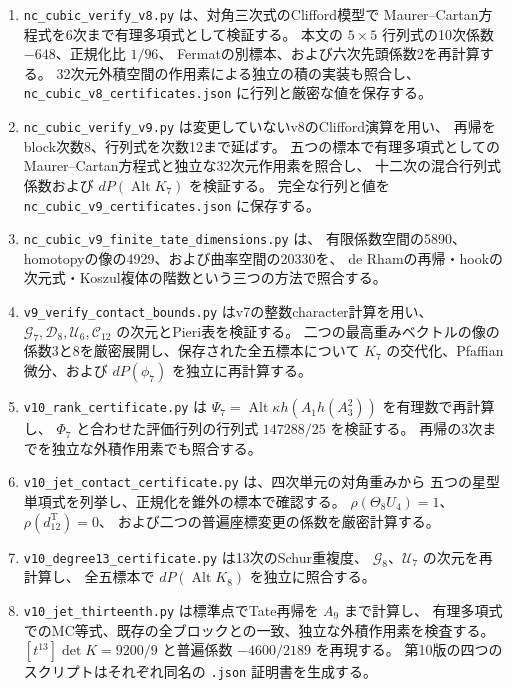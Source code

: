 \documentclass[a4paper,11pt]{ltjsarticle}
\theoremstyle{definition}
\begin{document}
\begin{enumerate}
 characterに適合する候補を選び、Reynolds投影によるJacobian像の階数2、
 Hessian候補を加えた階数3、および非所属を示す一つの単項式の係数を検証する。
 このコードは実際の境界の10次係数を決定するものではない。
 \item \texttt{nc\_cubic\_verify\_v8.py} は、対角三次式のClifford模型で
 Maurer--Cartan方程式を6次まで有理多項式として検証する。
 本文の $5\times5$ 行列式の10次係数 $-648$、正規化比 $1/96$、
 Fermatの別標本、および六次先頭係数2を再計算する。
 32次元外積空間の作用素による独立の積の実装も照合し、
 \texttt{nc\_cubic\_v8\_certificates.json} に行列と厳密な値を保存する。
 \item \texttt{nc\_cubic\_verify\_v9.py} は変更していないv8のClifford演算を用い、
 再帰をblock次数8、行列式を次数12まで延ばす。
 五つの標本で有理多項式としてのMaurer--Cartan方程式と独立な32次元作用素を照合し、
 十二次の混合行列式係数および $dP(\operatorname{Alt}K_7)$ を検証する。
 完全な行列と値を \texttt{nc\_cubic\_v9\_certificates.json} に保存する。
 \item \texttt{nc\_cubic\_v9\_finite\_tate\_dimensions.py} は、
 有限係数空間の5890、homotopyの像の4929、および曲率空間の20330を、
 de Rhamの再帰・hookの次元式・Koszul複体の階数という三つの方法で照合する。
 \item \texttt{v9\_verify\_contact\_bounds.py} はv7の整数character計算を用い、
 $\mathcal G_7,\mathcal D_8,\mathcal U_6,\mathcal C_{12}$ の次元とPieri表を検証する。
 二つの最高重みベクトルの像の係数3と8を厳密展開し、保存された全五標本について
 $K_7$ の交代化、Pfaffian微分、および $dP(\phi_7)$ を独立に再計算する。
 \item \texttt{v10\_rank\_certificate.py} は
 $\Psi_7=\operatorname{Alt}\kappa h(A_1h(A_3^2))$ を有理数で再計算し、
 $\Phi_7$ と合わせた評価行列の行列式 $147288/25$ を検証する。
 再帰の3次までを独立な外積作用素でも照合する。
 \item \texttt{v10\_jet\_contact\_certificate.py} は、四次単元の対角重みから
 五つの星型単項式を列挙し、正規化を錐外の標本で確認する。
 $\rho(\Theta_8U_4)=1$、$\rho(d^{\mathrm T}_{12})=0$、
 および二つの普遍座標変更の係数を厳密計算する。
 \item \texttt{v10\_degree13\_certificate.py} は13次のSchur重複度、
 $\mathcal G_8$、$\mathcal U_7$ の次元を再計算し、
 全五標本で $dP(\operatorname{Alt}K_8)$ を独立に照合する。
 \item \texttt{v10\_jet\_thirteenth.py} は標準点でTate再帰を $A_9$ まで計算し、
 有理多項式でのMC等式、既存の全ブロックとの一致、独立な外積作用素を検査する。
 $[t^{13}]\det K=9200/9$ と普遍係数 $-4600/2189$ を再現する。
 第10版の四つのスクリプトはそれぞれ同名の \texttt{.json} 証明書を生成する。


\end{enumerate}
\end{document}
